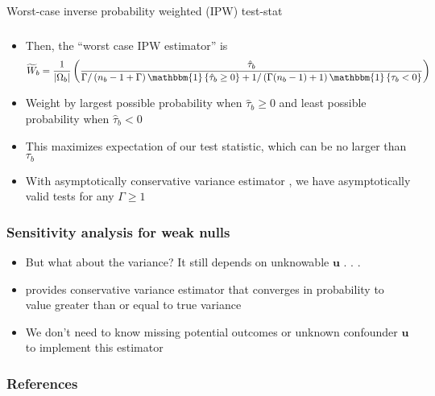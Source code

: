 \documentclass[table, xcolor = {dvipsnames}, 9pt]{beamer}
\theoremstyle{plain}
\begin{document}
\begin{frame}[t]{Worst-case inverse probability weighted (IPW) test-stat}
\frametitle{} 
\vfill
\begin{itemize} \vfill
\item Then, the ``worst case IPW estimator'' is \vfill
\small
\begin{equation}
\widetilde{W}_b = \dfrac{1}{\left\lvert \Omega_b \right \rvert}\left(\dfrac{\hat{\tau}_b}{\Gamma / \left(n_b - 1 + \Gamma\right) \mathbbm{1}\left\{\hat{\tau}_b \geq 0\right\} + 1 / \left(\Gamma(n_b - 1) + 1\right)\mathbbm{1}\left\{\tau_b < 0\right\}}\right)
\end{equation} \normalsize \vfill
\normalsize
\item Weight by largest possible probability when $\hat{\tau}_b \geq 0$ and least possible probability when $\hat{\tau}_b < 0$ \vfill
\item This maximizes expectation of our test statistic, which can be no larger than $\tau_b$ \vfill
\item With asymptotically conservative variance estimator \citep{fogarty2018,fogarty2020}, we have asymptotically valid tests for any $\Gamma \geq 1$ \vfill
\end{itemize}  
\vfill
\end{frame}

\begin{frame}[t]
\frametitle{Sensitivity analysis for weak nulls} 
\vfill
\begin{itemize} \vfill
\item But what about the variance? It still depends on unknowable $\bm{u}$ . . .  \vfill
\item \citet{fogarty2018} provides conservative variance estimator that converges in probability to value greater than or equal to true variance \vfill
\item We don't need to know missing potential outcomes or unknown confounder $\bm{u}$ to implement this estimator \vfill
\end{itemize}  
\vfill
\end{frame}
\begin{frame}[allowframebreaks]
\frametitle{References} 
\scriptsize

\end{frame}
\end{document}
